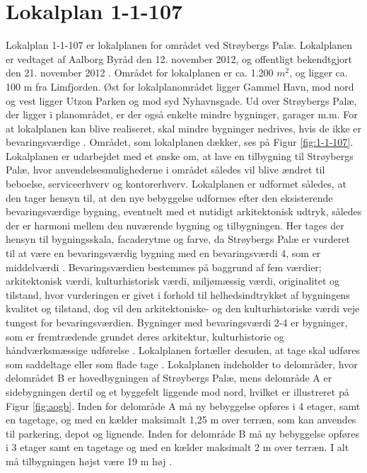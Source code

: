 \section{Lokalplan 1-1-107}
Lokalplan 1-1-107 er lokalplanen for området ved Strøybergs Palæ. Lokalplanen er vedtaget af Aalborg Byråd den 12. november 2012, og offentligt bekendtgjort den 21. november 2012 \citep[ s. 20]{lokalplan}.
\newline \indent{     }  Området for lokalplanen er ca. 1.200 $m^2$, og ligger ca. 100 m fra Limfjorden. Øst for lokalplanområdet ligger Gammel Havn, mod nord og vest ligger Utzon Parken og mod syd Nyhavnsgade. Ud over Strøybergs Palæ, der ligger i planområdet, er der også enkelte mindre bygninger, garager m.m. For at lokalplanen kan blive realiseret, skal mindre bygninger nedrives, hvis de ikke er bevaringsværdige \citep[ s. 6]{lokalplan}. Området, som lokalplanen dækker, ses på Figur \ref{fig:1-1-107}.
\newline \indent{     }  Lokalplanen er udarbejdet med et ønske om, at lave en tilbygning til Strøybergs Palæ, hvor anvendelsesmulighederne i området således vil blive ændret til beboelse, serviceerhverv og kontorerhverv. Lokalplanen er udformet således, at den tager hensyn til, at den nye bebyggelse udformes efter den eksisterende bevaringsværdige bygning, eventuelt med et nutidigt arkitektonisk udtryk, således der er harmoni mellem den nuværende bygning og tilbygningen. Her tages der hensyn til bygningsskala, facaderytme og farve, da Strøybergs Palæ er vurderet til at være en bevaringsværdig bygning med en bevaringsværdi 4, som er middelværdi \citep[ s. 5 og 9]{lokalplan}. Bevaringsværdien bestemmes på baggrund af fem værdier; arkitektonisk værdi, kulturhistorisk værdi, miljømæssig værdi, originalitet og tilstand, hvor vurderingen er givet i forhold til helhedsindtrykket af bygningens kvalitet og tilstand, dog vil den arkitektoniske- og den kulturhistoriske værdi veje tungest for bevaringsværdien. Bygninger med bevaringsværdi 2-4 er bygninger, som er fremtrædende grundet deres arkitektur, kulturhistorie og håndværksmæssige udførelse \citep{bevaringsvaerdi}. Lokalplanen fortæller desuden, at tage skal udføres som saddeltage eller som flade tage \citep[ s. 17]{lokalplan}.
\newline \indent{     }  Lokalplanen indeholder to delområder, hvor delområdet B er hovedbygningen af Strøybergs Palæ, mens delområde A er sidebygningen dertil og et byggefelt liggende mod nord, hvilket er illustreret på Figur \ref{fig:aogb}. Inden for delområde A må ny bebyggelse opføres i 4 etager, samt en tagetage, og med en kælder maksimalt 1,25 m over terræn, som kan anvendes til parkering, depot og lignende. Inden for delområde B må ny bebyggelse opføres i 3 etager samt en tagetage og med en kælder maksimalt 2 m over terræn. I alt må tilbygningen højst være 19 m høj \citep[ s. 7 og 16]{lokalplan}.

